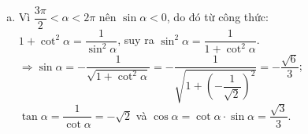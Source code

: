 \begin{bt}
{\begin{enumerate}[a)]
			$\Rightarrow\cos\alpha=-\dfrac{1}{\sqrt{1+\tan^2\alpha}}=-\dfrac{1}{\sqrt{1+(\sqrt{5})^2}}=-\dfrac{\sqrt{6}}{6}$;\\ $\cot\alpha=\dfrac{1}{\tan\alpha}=\dfrac{\sqrt{5}}{5}$ và $\sin\alpha=\tan\alpha\cdot\cos\alpha=-\dfrac{\sqrt{30}}{6}$.
			\item 
			Vì $\dfrac{3\pi}{2}<\alpha<2\pi$ nên $\sin\alpha<0$, do đó từ công thức:\\
			$1+\cot^2\alpha=\dfrac{1}{\sin^2\alpha}$, suy ra $\sin^2\alpha=\dfrac{1}{1+\cot^2\alpha}$.\\
			$\Rightarrow\sin\alpha=-\dfrac{1}{\sqrt{1+\cot^2\alpha}}=-\dfrac{1}{\sqrt{1+\left(-\dfrac{1}{\sqrt{2}}\right)^2}}=-\dfrac{\sqrt{6}}{3}$;\\ $\tan\alpha=\dfrac{1}{\cot\alpha}=-\sqrt{2}$ và $\cos\alpha=\cot\alpha\cdot\sin\alpha=\dfrac{\sqrt{3}}{3}$.
		\end{enumerate}
	}
\end{bt}

